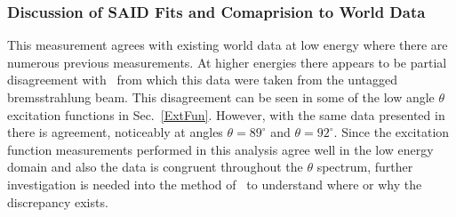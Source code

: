 \subsubsection{Discussion of SAID Fits and Comaprision to World Data}\label{sec:discussion}
This measurement agrees with existing world data at low energy where there are numerous previous measurements. At higher energies there appears to be partial disagreement with~\cite{brem} from which this data were taken from the untagged bremsstrahlung beam. This disagreement can be seen in some of the low angle $\theta$ excitation functions in Sec.~\ref{ExtFun}. However, with the same data presented in~\cite{brem} there is agreement, noticeably at angles $\theta = 89^\circ$ and $\theta = 92^\circ$. Since the excitation function measurements performed in this analysis agree well in the low energy domain and also the data is congruent throughout the $\theta$ spectrum, further investigation is needed into the method of~\cite{brem} to understand where or why the discrepancy exists.
%
%
\FloatBarrier

